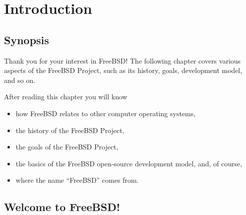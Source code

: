 \chapter{Introduction}

\section{Synopsis}

Thank you for your interest in FreeBSD! The following chapter covers various
aspects of the FreeBSD Project, such as its history, goals, development model,
and so on.

After reading this chapter you will know
\begin{itemize}
\item
   how FreeBSD relates to other computer operating systems,
\item
   the history of the FreeBSD Project,
\item
   the goals of the FreeBSD Project,
\item
   the basics of the FreeBSD open-source development model, and, of course,
\item
   where the name ``FreeBSD'' comes from.
\end{itemize}



\section{Welcome to FreeBSD!}

